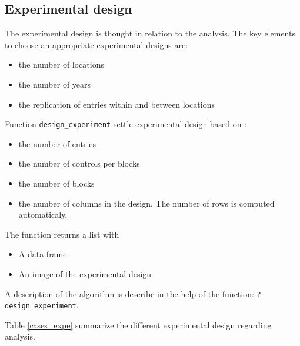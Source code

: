 \documentclass{article}\usepackage[]{graphicx}\usepackage[]{color}
\begin{document}
\subsection{Experimental design}

The experimental design is thought in relation to the analysis.
The key elements to choose an appropriate experimental designs are:
\begin{itemize}
\item the number of locations
\item the number of years
\item the replication of entries within and between locations
\end{itemize}

\noindent Function \texttt{design\_experiment} settle experimental design based on :
\begin{itemize} 
\item the number of entries
\item the number of controls per blocks
\item the number of blocks
\item the number of columns in the design. The number of rows is computed automaticaly.
\end{itemize} 

\noindent The function returns a list with
\begin{itemize} 
\item A data frame
\item An image of the experimental design
\end{itemize} 

\noindent A description of the algorithm is describe in the help of the function: \texttt{?design\_experiment}.

\noindent Table \ref{cases_expe} summarize the different experimental design regarding analysis.
\end{document}
